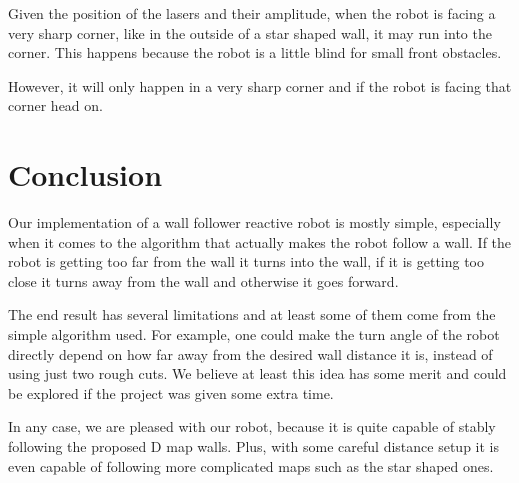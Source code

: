\documentclass[10pt,journal,compsoc]{IEEEtran}
\begin{document}
Given the position of the lasers and their amplitude, when the robot is facing a very sharp corner, like in the outside of a star shaped wall, it may run into the corner. This happens because the robot is a little blind for small front obstacles.

However, it will only happen in a very sharp corner and if the robot is facing that corner head on.


\section{Conclusion}

Our implementation of a wall follower reactive robot is mostly simple, especially when it comes to the algorithm that actually makes the robot follow a wall. If the robot is getting too far from the wall it turns into the wall, if it is getting too close it turns away from the wall and otherwise it goes forward.

The end result has several limitations and at least some of them come from the simple algorithm used. For example, one could make the turn angle of the robot directly depend on how far away from the desired wall distance it is, instead of using just two rough cuts. We believe at least this idea has some merit and could be explored if the project was given some extra time.

In any case, we are pleased with our robot, because it is quite capable of stably following the proposed D map walls. Plus, with some careful distance setup it is even capable of following more complicated maps such as the star shaped ones.

\ifCLASSOPTIONcaptionsoff
\newpage
\fi

%
%
\end{document}
